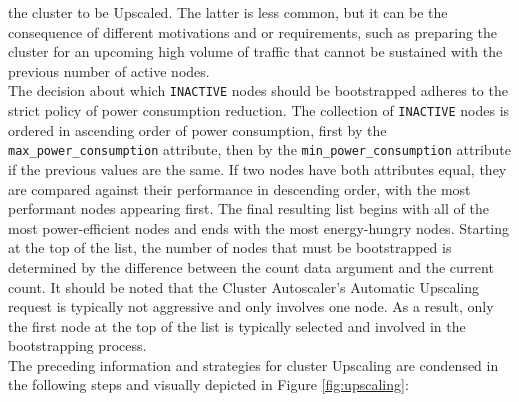 the cluster to be Upscaled. The latter is less common, but it can be the consequence
of different motivations and or requirements, such as preparing the cluster for
an upcoming high volume of traffic that cannot be sustained with the previous
number of active nodes. \\ %
The decision about which \texttt{INACTIVE} nodes should be bootstrapped adheres to
the strict policy of power consumption reduction. The collection of \texttt{INACTIVE}
nodes is ordered in ascending order of power consumption, first by the \texttt{max\_power\_consumption}
attribute, then by the \texttt{min\_power\_consumption} attribute if the previous
values are the same. If two nodes have both attributes equal, they are compared against
their performance in descending order, with the most performant nodes appearing
first. The final resulting list begins with all of the most power-efficient nodes
and ends with the most energy-hungry nodes. Starting at the top of the list, the
number of nodes that must be bootstrapped is determined by the difference between
the count data argument and the current count. It should be noted that the
Cluster Autoscaler's Automatic Upscaling request is typically not aggressive and
only involves one node. As a result, only the first node at the top of the list
is typically selected and involved in the bootstrapping process. \\ %
The preceding information and strategies for cluster Upscaling are condensed in
the following steps and visually depicted in Figure \ref{fig:upscaling}:
